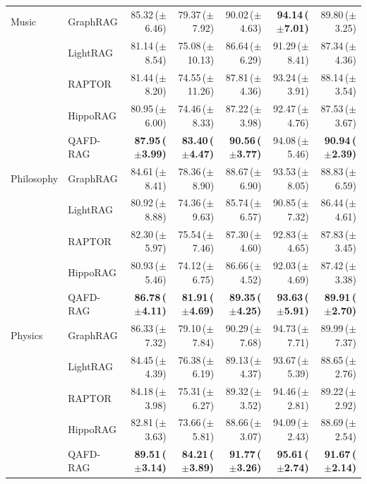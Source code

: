 \documentclass{article} %
\newcommand{\score}[2]{#1\,($\pm$#2)}   %
\newcommand{\best}[1]{\textbf{#1}}      %
\begin{document}
\begin{table}[t]
{\begin{tabular}{llrrrrr}
\midrule
Music & GraphRAG  & \score{85.32}{6.46} & \score{79.37}{7.92} & \score{90.02}{4.63} & \best{\score{94.14}{7.01}} & \score{89.80}{3.25} \\
      & LightRAG  & \score{81.14}{8.54} & \score{75.08}{10.13} & \score{86.64}{6.29} & \score{91.29}{8.41} & \score{87.34}{4.36} \\
      & RAPTOR & \score{81.44}{8.20} & \score{74.55}{11.26} & \score{87.81}{4.36} & \score{93.24}{3.91} & \score{88.14}{3.54} \\
      & HippoRAG & \score{80.95}{6.00} & \score{74.46}{8.33} & \score{87.22}{3.98} & \score{92.47}{4.76} & \score{87.53}{3.67} \\
      & QAFD-RAG  & \best{\score{87.95}{3.99}} & \best{\score{83.40}{4.47}} & \best{\score{90.56}{3.77}} & \score{94.08}{5.46} & \best{\score{90.94}{2.39}} \\
\midrule
Philosophy & GraphRAG  & \score{84.61}{8.41} & \score{78.36}{8.90} & \score{88.67}{6.90} & \score{93.53}{8.05} & \score{88.83}{6.59} \\
           & LightRAG  & \score{80.92}{8.88} & \score{74.36}{9.63} & \score{85.74}{6.57} & \score{90.85}{7.32} & \score{86.44}{4.61} \\
           & RAPTOR & \score{82.30}{5.97} & \score{75.54}{7.46} & \score{87.30}{4.60} & \score{92.83}{4.65} & \score{87.83}{3.45} \\
           & HippoRAG & \score{80.93}{5.46} & \score{74.12}{6.75} & \score{86.66}{4.52} & \score{92.03}{4.69} & \score{87.42}{3.38} \\
           & QAFD-RAG  & \best{\score{86.78}{4.11}} & \best{\score{81.91}{4.69}} & \best{\score{89.35}{4.25}} & \best{\score{93.63}{5.91}} & \best{\score{89.91}{2.70}} \\
\midrule

Physics & GraphRAG  & \score{86.33}{7.32} & \score{79.10}{7.84} & \score{90.29}{7.68} & \score{94.73}{7.71} & \score{89.99}{7.37} \\
        & LightRAG  & \score{84.45}{4.39} & \score{76.38}{6.19} & \score{89.13}{4.37} & \score{93.67}{5.39} & \score{88.65}{2.76} \\
        & RAPTOR & \score{84.18}{3.98} & \score{75.31}{6.27} & \score{89.32}{3.52} & \score{94.46}{2.81} & \score{89.22}{2.92} \\
        & HippoRAG & \score{82.81}{3.63} & \score{73.66}{5.81} & \score{88.66}{3.07} & \score{94.09}{2.43} & \score{88.69}{2.54} \\
        & QAFD-RAG  & \best{\score{89.51}{3.14}} & \best{\score{84.21}{3.89}} & \textbf{\score{91.77}{3.26}} & \best{\score{95.61}{2.74}} & \best{\score{91.67}{2.14}} \\
\bottomrule
\end{tabular}
}
\end{table}
\end{document}
